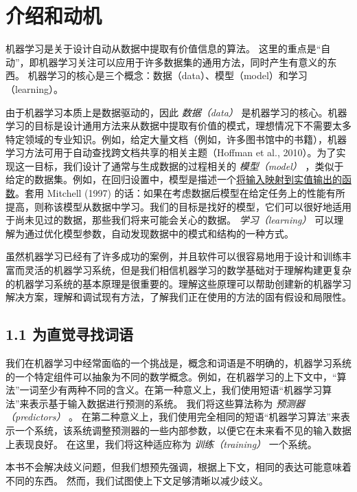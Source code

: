\chapter*{介绍和动机}

机器学习是关于设计自动从数据中提取有价值信息的算法。 这里的重点是“自动”，即机器学习关注可以应用于许多数据集的通用方法，同时产生有意义的东西。 机器学习的核心是三个概念：数据（data）、模型（model）和学习（learning）。

由于机器学习本质上是数据驱动的，因此 \emph{数据（data）} 是机器学习的核心。机器学习的目标是设计通用方法来从数据中提取有价值的模式，理想情况下不需要太多特定领域的专业知识。例如，给定大量文档（例如，许多图书馆中的书籍），机器学习方法可用于自动查找跨文档共享的相关主题（Hoffman et al., 2010）。为了实现这一目标，我们设计了通常与生成数据的过程相关的 \emph{模型（model）} ，类似于给定的数据集。例如，在回归设置中，模型是描述一个\href{https://baike.baidu.com/item/\%E5\%AE\%9E\%E5\%80\%BC\%E5\%87\%BD\%E6\%95\%B0/7037793}{将输入映射到实值输出的函数}。套用 Mitchell (1997) 的话：如果在考虑数据后模型在给定任务上的性能有所提高，则称该模型从数据中学习。我们的目标是找好的模型，它们可以很好地适用于尚未见过的数据，那些我们将来可能会关心的数据。 \emph{学习（learning）} 可以理解为通过优化模型参数，自动发现数据中的模式和结构的一种方式。

虽然机器学习已经有了许多成功的案例，并且软件可以很容易地用于设计和训练丰富而灵活的机器学习系统，但是我们相信机器学习的数学基础对于理解构建更复杂的机器学习系统的基本原理是很重要的。理解这些原理可以帮助创建新的机器学习解决方案，理解和调试现有方法，了解我们正在使用的方法的固有假设和局限性。

\section*{1.1 为直觉寻找词语}
\label{sec:1.1}

我们在机器学习中经常面临的一个挑战是，概念和词语是不明确的，机器学习系统的一个特定组件可以抽象为不同的数学概念。例如，在机器学习的上下文中，“算法”一词至少有两种不同的含义。在第一种意义上，我们使用短语“机器学习算法”来表示基于输入数据进行预测的系统。 我们将这些算法称为 \emph{预测器（predictors）} 。 在第二种意义上，我们使用完全相同的短语“机器学习算法”来表示一个系统，该系统调整预测器的一些内部参数，以便它在未来看不见的输入数据上表现良好。 在这里，我们将这种适应称为 \emph{训练（training）} 一个系统。

本书不会解决歧义问题，但我们想预先强调，根据上下文，相同的表达可能意味着不同的东西。 然而，我们试图使上下文足够清晰以减少歧义。

